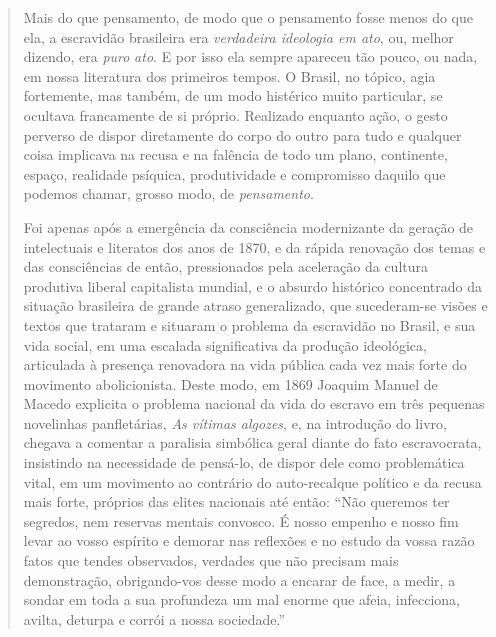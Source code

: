 \begin{quote}
Mais do que pensamento, de modo que o pensamento fosse menos do que ela,
a escravidão brasileira era \emph{verdadeira ideologia em ato}, ou,
melhor dizendo, era \emph{puro} \emph{ato}. E por isso ela sempre
apareceu tão pouco, ou nada, em nossa literatura dos primeiros tempos. O
Brasil, no tópico, agia fortemente, mas também, de um modo histérico
muito particular, se ocultava francamente de si próprio. Realizado
enquanto ação, o gesto perverso de dispor diretamente do corpo do outro
para tudo e qualquer coisa implicava na recusa e na falência de todo um
plano, continente, espaço, realidade psíquica, produtividade e
compromisso daquilo que podemos chamar, grosso modo, de
\emph{pensamento}.

Foi apenas após a emergência da consciência modernizante da geração de
intelectuais e literatos dos anos de 1870, e da rápida renovação dos
temas e das consciências de então, pressionados pela aceleração da
cultura produtiva liberal capitalista mundial, e o absurdo histórico
concentrado da situação brasileira de grande atraso generalizado, que
sucederam-se visões e textos que trataram e situaram o problema da
escravidão no Brasil, e sua vida social, em uma escalada significativa
da produção ideológica, articulada à presença renovadora na vida pública
cada vez mais forte do movimento abolicionista. Deste modo, em 1869
Joaquim Manuel de Macedo explicita o problema nacional da vida do
escravo em três pequenas novelinhas panfletárias, \emph{As vítimas
algozes}, e, na introdução do livro, chegava a comentar a paralisia
simbólica geral diante do fato escravocrata, insistindo na necessidade
de pensá-lo, de dispor dele como problemática vital, em um movimento ao
contrário do auto-recalque político e da recusa mais forte, próprios das
elites nacionais até então: ``Não queremos ter segredos, nem reservas
mentais convosco. É nosso empenho e nosso fim levar ao vosso espírito e
demorar nas reflexões e no estudo da vossa razão fatos que tendes
observados, verdades que não precisam mais demonstração, obrigando-vos
desse modo a encarar de face, a medir, a sondar em toda a sua profundeza
um mal enorme que afeia, infecciona, avilta, deturpa e corrói a nossa
sociedade.''


\end{quote}
